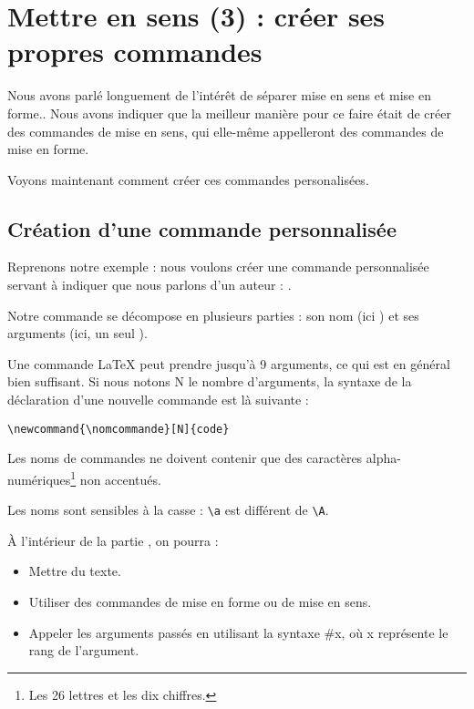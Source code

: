 \chapter{Mettre en sens (3) : créer ses propres commandes}

\begin{prealable}
Nous avons parlé longuement de l'intérêt de séparer mise en sens et mise en forme..
Nous avons indiquer que la meilleur manière pour ce faire était de créer des commandes de mise en sens, qui elle-même appelleront des commandes de mise en forme.

Voyons maintenant comment créer ces commandes personalisées.
\end{prealable}

\section{Création d'une commande personnalisée}

Reprenons notre exemple : nous voulons créer une commande personnalisée servant à indiquer que nous parlons d'un auteur : .

Notre commande se décompose en plusieurs parties : son nom (ici ) et ses arguments (ici, un seul ).

Une commande LaTeX peut prendre jusqu'à 9 arguments, ce qui est en général bien suffisant. Si nous notons N le nombre d'arguments, la syntaxe de la déclaration d'une nouvelle commande est là suivante :

\begin{verbatim}
\newcommand{\nomcommande}[N]{code}
\end{verbatim}

\begin{attention}
	Les noms de commandes ne doivent contenir que des caractères alpha-numériques\footnote{Les 26 lettres et les dix chiffres.} non accentués. 
	
	Les noms sont sensibles à la casse : \verb|\a| est différent de \verb|\A|.
\end{attention}
À l'intérieur de la partie , on pourra  :
\begin{itemize}
	\item Mettre du texte.
	\item Utiliser des commandes de mise en forme ou de mise en sens.
	\item Appeler les arguments passés en utilisant la syntaxe \#x, où x représente le rang de l'argument.
\end{itemize}

